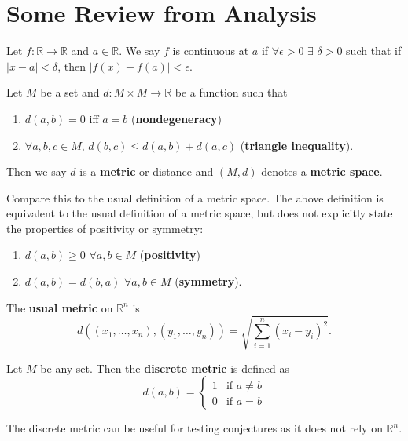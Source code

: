 \section{Some Review from Analysis}
\begin{definition}
	Let $f : \mathbb{R} \rightarrow \mathbb{R}$ and $a \in \mathbb{R}$. We say $f$ is continuous at $a$ if $\forall \epsilon > 0$ $\exists$ $\delta > 0$ such that if $|x-a|<\delta$, then $|f(x)-f(a)|<\epsilon$. 
\end{definition}
\begin{definition}
	Let $M$ be a set and $d: M \times M \rightarrow \mathbb{R}$ be a function such that 
	\begin{enumerate}
		\item $d(a,b)=0$ iff $a=b$ (\textbf{nondegeneracy}) 
		\item $\forall a,b,c \in M$, $d(b,c) \leq d(a,b) + d(a,c)$ (\textbf{triangle inequality}). 
	\end{enumerate}
	Then we say $d$ is a \textbf{metric} or distance and $(M,d)$ denotes a \textbf{metric space}. 
\end{definition}

\noindent Compare this to the usual definition of a metric space. The above definition is equivalent to the usual definition of a metric space, but does not explicitly state the properties of positivity or symmetry: 
\begin{enumerate}
	\item $d(a,b) \geq 0$ $\forall a,b \in M$ (\textbf{positivity}) 
	\item $d(a,b) = d(b,a)$ $\forall a,b \in M$ (\textbf{symmetry}). 
\end{enumerate}
\begin{definition}
	The \textbf{usual metric} on $\mathbb{R}^{n}$ is 
	\begin{displaymath}
		d((x_1,\ldots,x_n),(y_1,\ldots,y_n)) = \sqrt{\sum_{i=1}^n (x_i-y_i)^2}. 
	\end{displaymath}
\end{definition}
\begin{definition}
	Let $M$ be any set. Then the \textbf{discrete metric} is defined as 
	\begin{displaymath}
		d(a,b) = \left\{ 
		\begin{array}{lr}
			1 & \text{if } a \neq b \\
			0 & \text{if } a = b 
		\end{array}
		\right. 
	\end{displaymath}
\end{definition}
The discrete metric can be useful for testing conjectures as it does not rely on $\mathbb{R}^n$.

